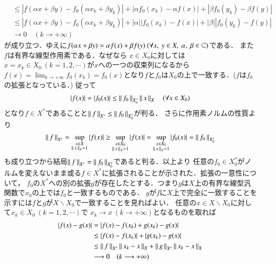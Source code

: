 \begin{prf}
\begin{description}
\begin{align}
			&\leq |f(\alpha x + \beta y) - f_0(\alpha x_k + \beta y_k)| 
				+ |\alpha f_0(x_k) - \alpha f(x)| + |\beta f_0(y_k) - \beta f(y)| \\
			&\leq |f(\alpha x + \beta y) - f_0(\alpha x_k + \beta y_k)| 
				+ |\alpha| |f_0(x_k) - f(x)| + |\beta| |f_0(y_k) - f(y)| \\
			&\longrightarrow 0\quad (k \longrightarrow +\infty)
		\end{align}
		が成り立つ．ゆえに$f(\alpha x + \beta y) = \alpha f(x) + \beta f(y)\ (\forall x,\ y \in X,\ \alpha,\ \beta \in \C)$である．
		また$f$は有界な線型作用素である．なぜなら
		$x \in X_0$に対しては$x= x_k \in X_0\ (k=1,2,\cdots)$が$x$への一つの収束列になるから
		$\displaystyle f(x) = \lim_{k \to +\infty} f_0(x_k) = f_0(x)$となり$f$と$f_0$は$X_0$の上で一致する．($f$は$f_0$の拡張となっている．)
		従って
		\begin{align}
			|f(x)| = |f_0(x)| \leq \left\|\, f_0\, \right\|_{X_0^*} \left\|\, x\, \right\|_{X}\quad (\forall x \in X_0)
		\end{align}
		となり$f \in X^*$であることと$\left\|\, f\, \right\|_{X^*} \leq \left\|\, f_0\, \right\|_{X_0^*}$が判る．
		さらに作用素ノルムの性質より
		\begin{align}
			\left\|\, f\, \right\|_{X^*} = \operatorname*{sup}_{\substack{x \in X \\ \left\|\, x\, \right\|_{X} = 1}} |f(x)| 
			\geq \operatorname*{sup}_{\substack{x \in X_0 \\ \left\|\, x\, \right\|_{X} = 1}} |f(x)| 
			= \operatorname*{sup}_{\substack{x \in X_0 \\ \left\|\, x\, \right\|_{X} = 1}} |f_0(x)| = \left\|\, f_0\, \right\|_{X_0^*}
		\end{align}
		も成り立つから結局$\left\|\, f\, \right\|_{X^*} = \left\|\, f_0\, \right\|_{X_0^*}$であると判る．以上より
		任意の$f_0 \in X_0^*$がノルムを変えないまま或る$f \in X^*$に拡張されることが示された．拡張の一意性について，
		$f_0$の$X^*$への別の拡張$g$が存在したとする．つまり$g$は$X$上の有界な線型汎関数で$x_0$の上では$f_0$と一致するものである．
		$g$が$f$に$X$上で完全に一致することを示すには$f$と$g$が$X \backslash X_0$で一致することを見ればよい．
		任意の$x \in X \backslash X_0$に対して$x_k \in X_0\ (k = 1,2,\cdots)$で
		$x_k \longrightarrow x\ (k \longrightarrow +\infty)$となるものを取れば
		\begin{align}
			\left| f(x) - g(x) \right| &= \left| f(x) - f(x_k) + g(x_k) - g(x) \right| \\
			&\leq \left| f(x) - f(x_k) \right| + \left|g(x_k) - g(x) \right| \\
			&\leq \Norm{f}{X^*}\Norm{x_k - x}{X} + \Norm{g}{X^*}\Norm{x_k - x}{X} \\
			&\longrightarrow 0 \quad (k \longrightarrow +\infty)

\end{align}
\end{description}
\end{prf}
